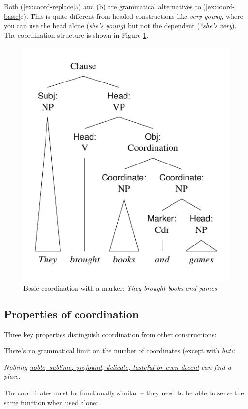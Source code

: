 \ea \label{ex:coord-replace}
    \z
\z

Both (\ref{ex:coord-replace}a) and (b) are grammatical alternatives to (\ref{ex:coord-basic}c). This is quite different from headed constructions like \textit{very young}, where you can use the head alone (\textit{she's young}) but not the dependent (\textit{*she's very}). The coordination structure is shown in Figure \ref{fig:coord-basic}.

\begin{figure}
    \centering
    \includegraphics[width=0.65\linewidth]{figures/the brought books and games.pdf}
    \caption{Basic coordination with a marker: \textit{They brought books and games}}\label{fig:coord-basic}
\end{figure}

\subsection{Properties of coordination}

Three key properties distinguish coordination from other constructions:

There's no grammatical limit on the number of coordinates (except with \textit{but}):
    
\ea \label{ex:coord-multiple}
    \textit{Nothing \uline{noble, sublime, profound, delicate, tasteful or even decent} can find a place.}
\z

The coordinates must be functionally similar~-- they need to be able to serve the same function when used alone:

